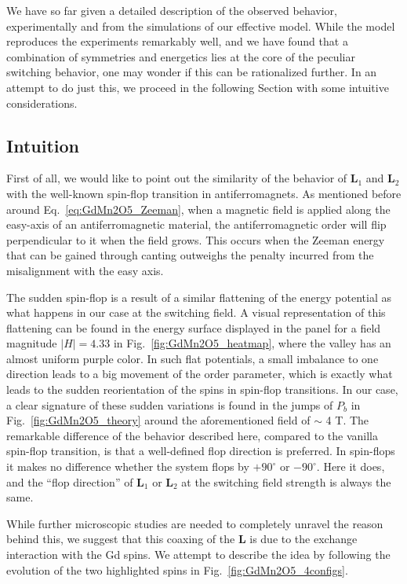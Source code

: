 We have so far given a detailed description of the observed behavior, experimentally and from the simulations of our effective model.
While the model reproduces the experiments remarkably well, and we have found that a combination of symmetries and energetics lies at the core of the peculiar switching behavior, one may wonder if this can be rationalized further.
In an attempt to do just this, we proceed in the following Section with some intuitive considerations.

\subsection{Intuition \label{sec:GdMn2O5_intuitive}}
First of all, we would like to point out the similarity of the behavior of $\bm L_1$ and $\bm L_2$ with the well-known spin-flop transition in antiferromagnets.
As mentioned before around Eq.~\eqref{eq:GdMn2O5_Zeeman}, when a magnetic field is applied along the easy-axis of an antiferromagnetic material, the antiferromagnetic order will flip perpendicular to it when the field grows.
This occurs when the Zeeman energy that can be gained through canting outweighs the penalty incurred from the misalignment with the easy axis.

The sudden spin-flop is a result of a similar flattening of the energy potential as what happens in our case at the switching field. A visual representation of this flattening can be found in the energy surface displayed in the panel for a field magnitude $|H| = 4.33$ in Fig.~\ref{fig:GdMn2O5_heatmap}, where the valley has an almost uniform purple color.
In such flat potentials, a small imbalance to one direction leads to a big movement of the order parameter, which is exactly what leads to the sudden reorientation of the spins in spin-flop transitions.
In our case, a clear signature of these sudden variations is found in the jumps of $P_b$ in Fig.~\ref{fig:GdMn2O5_theory} around the aforementioned field of $\sim$ 4 T.
The remarkable difference of the behavior described here, compared to the vanilla spin-flop transition, is that a well-defined flop direction is preferred. In spin-flops it makes no difference whether the system flops by $+90^\circ$ or $-90^\circ$. Here it does, and the ``flop direction'' of $\bm L_1$ or $\bm L_2$ at the switching field strength is always the same.

While further microscopic studies are needed to completely unravel the reason behind this, we suggest that this coaxing of the $\bm L$ is due to the exchange interaction with the Gd spins. We attempt to describe the idea by following the evolution of the two highlighted spins in Fig.~\ref{fig:GdMn2O5_4configs}.

